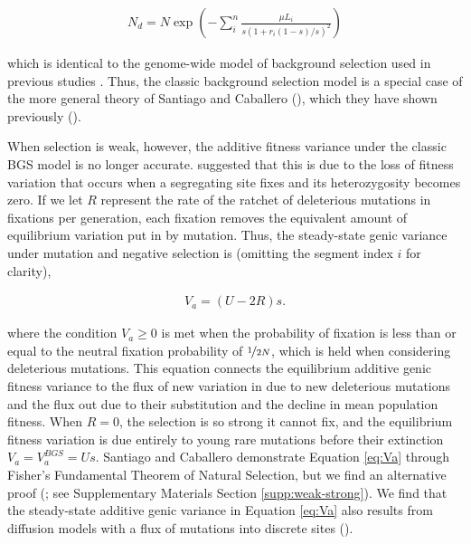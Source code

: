 \documentclass[11pt]{article}
\begin{document}
\begin{align}
    N_d = N \exp \left( - \sum_i^n \frac{\mu L_i}{s(1 + r_i(1-s)/s)^2} \right) 
\end{align}

which is identical to the genome-wide model of background selection used in
previous studies \parencite{McVicker2009-ax,Elyashiv2016-vt,Murphy2022-sj}.
Thus, the classic background selection model is a special case of the more
general theory of Santiago and Caballero (\citeyear{Santiago2016-mu}), which
they have shown previously (\citeyear{Santiago1998-bs}).

When selection is weak, however, the additive fitness variance under the
classic BGS model is no longer accurate. \textcite{Santiago2016-mu} suggested
that this is due to the loss of fitness variation that occurs when a
segregating site fixes and its heterozygosity becomes zero. If we let $R$
represent the rate of the ratchet of deleterious mutations in fixations per
generation, each fixation removes the equivalent amount of equilibrium
variation put in by mutation. Thus, the steady-state genic variance under
mutation and negative selection is (omitting the segment index $i$ for
clarity),

\begin{align}
  \label{eq:Va}
  V_{a} = (U - 2 R)s. 
\end{align}

where the condition $V_a \ge 0$ is met when the probability of fixation is less
than or equal to the neutral fixation probability of $\nicefrac{1}{2N}$, which
is held when considering deleterious mutations. This equation connects the
equilibrium additive genic fitness variance to the flux of new variation in due
to new deleterious mutations and the flux out due to their substitution and the
decline in mean population fitness. When $R=0$, the selection is so strong it
cannot fix, and the equilibrium fitness variation is due entirely to young rare
mutations before their extinction $V_a = V_a^{BGS} = Us$. Santiago and
Caballero demonstrate Equation \eqref{eq:Va} through Fisher's Fundamental
Theorem of Natural Selection, but we find an alternative proof
(\cite{Higgs1995-xc}; see Supplementary Materials Section
\ref{supp:weak-strong}). We find that the steady-state additive genic variance
in Equation \eqref{eq:Va} also results from diffusion models with a flux of
mutations into discrete sites (\cite{Kimura1969-jw}). 

\end{document}
